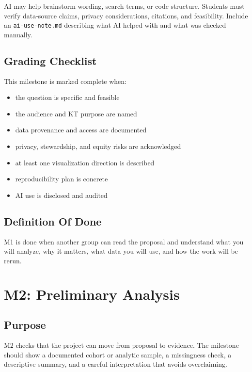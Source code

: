 \documentclass[
  letterpaper,
  DIV=11,
  numbers=noendperiod,
  oneside]{scrreprt}
\providecommand{\tightlist}{%
  \setlength{\itemsep}{0pt}\setlength{\parskip}{0pt}}
\begin{document}
AI may help brainstorm wording, search terms, or code structure.
Students must verify data-source claims, privacy considerations,
citations, and feasibility. Include an \texttt{ai-use-note.md}
describing what AI helped with and what was checked manually.

\section{Grading Checklist}\label{grading-checklist-1}

This milestone is marked complete when:

\begin{itemize}
\tightlist
\item
  the question is specific and feasible
\item
  the audience and KT purpose are named
\item
  data provenance and access are documented
\item
  privacy, stewardship, and equity risks are acknowledged
\item
  at least one visualization direction is described
\item
  reproducibility plan is concrete
\item
  AI use is disclosed and audited
\end{itemize}

\section{Definition Of Done}\label{definition-of-done-4}

M1 is done when another group can read the proposal and understand what
you will analyze, why it matters, what data you will use, and how the
work will be rerun.

\chapter{M2: Preliminary Analysis}\label{m2-preliminary-analysis}

\section{Purpose}\label{purpose-3}

M2 checks that the project can move from proposal to evidence. The
milestone should show a documented cohort or analytic sample, a
missingness check, a descriptive summary, and a careful interpretation
that avoids overclaiming.
\end{document}

